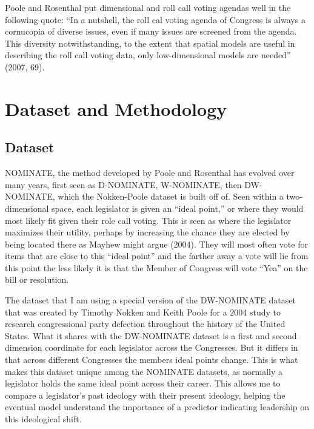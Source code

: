 \documentclass[12pt,twoside]{reedthesis}
\begin{document}
  Poole and Rosenthal put dimensional and roll call voting agendas well in
  the following quote: ``In a nutshell, the roll cal voting agenda of
  Congress is always a cornucopia of diverse issues, even if many issues
  are screened from the agenda. This diversity notwithstanding, to the
  extent that spatial models are useful in describing the roll call voting
  data, only low-dimensional models are needed'' (2007, 69).
  
  \chapter{Dataset and Methodology}\label{dataset-and-methodology}
  
  \section{Dataset}\label{dataset}
  
  NOMINATE, the method developed by Poole and Rosenthal has evolved over
  many years, first seen as D-NOMINATE, W-NOMINATE, then DW-NOMINATE,
  which the Nokken-Poole dataset is built off of. Seen within a
  two-dimensional space, each legislator is given an ``ideal point,'' or
  where they would most likely fit given their role call voting. This is
  seen as where the legislator maximizes their utility, perhaps by
  increasing the chance they are elected by being located there as Mayhew
  might argue (2004). They will most often vote for items that are close
  to this ``ideal point'' and the farther away a vote will lie from this
  point the less likely it is that the Member of Congress will vote
  ``Yea'' on the bill or resolution.
  
  The dataset that I am using a special version of the DW-NOMINATE dataset
  that was created by Timothy Nokken and Keith Poole for a 2004 study to
  research congressional party defection throughout the history of the
  United States. What it shares with the DW-NOMINATE dataset is a first
  and second dimension coordinate for each legislator across the
  Congresses. But it differs in that across different Congresses the
  members ideal points change. This is what makes this dataset unique
  among the NOMINATE datasets, as normally a legislator holds the same
  ideal point across their career. This allows me to compare a
  legislator's past ideology with their present ideology, helping the
  eventual model understand the importance of a predictor indicating
  leadership on this ideological shift.
  
\end{document}
